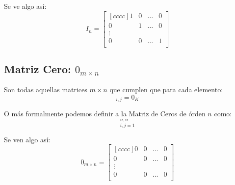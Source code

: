 \documentclass[12pt]{report}                                    %
\begin{document}
                Se ve algo así:
                \begin{equation*}
                    I_n =
                    \begin{bmatrix}[cccc]
                        1 & 0 & \dots & 0   \\
                        0 & 1 & \dots & 0   \\
                        \vdots              \\
                        0 & 0 & \dots & 1   \\
                    \end{bmatrix}
                \end{equation*}



            \subsection{Matriz Cero: $0_{m \times n}$}

                Son todas aquellas matrices $m \times n$ que cumplen que para cada elemento:
                \begin{equation}
                    [0]_{i,j} = 0_K
                \end{equation}

                O más formalmente podemos definir a la Matriz de Ceros de órden $n$ como:
                \begin{equation}
                    [0_{\mathbb{F}}]_{i, j = 1}^{n, n}
                \end{equation}

                Se ven algo así:
                \begin{equation*}
                    0_{m \times n} =
                    \begin{bmatrix}[cccc]
                        0 & 0 & \dots & 0   \\
                        0 & 0 & \dots & 0   \\
                        \vdots              \\
                        0 & 0 & \dots & 0   \\
                    \end{bmatrix}
                \end{equation*}
\end{document}
